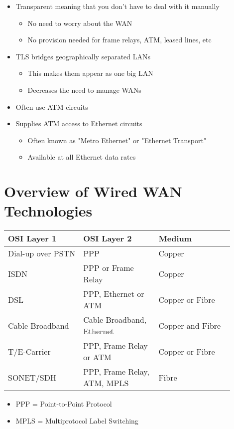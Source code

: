 \begin{itemize}
  \item Transparent meaning that you don't have to deal with it manually
  \begin{itemize}
    \item No need to worry about the WAN
    \item No provision needed for frame relays, ATM, leased lines, etc
  \end{itemize}
  \item TLS bridges geographically separated LANs
  \begin{itemize}
    \item This makes them appear as one big LAN
    \item Decreases the need to manage WANs
  \end{itemize}
  \item Often use ATM circuits
  \item Supplies ATM access to Ethernet circuits
  \begin{itemize}
    \item Often known as "Metro Ethernet" or "Ethernet Transport"
    \item Available at all Ethernet data rates
  \end{itemize}
\end{itemize}

\section*{Overview of Wired WAN Technologies}

\begin{center}
\begin{tabular}{ |p{0.3\linewidth}|p{0.3\linewidth}|p{0.3\linewidth}| }
  \hline
  OSI Layer 1 & OSI Layer 2 & Medium \\
  \hline
  Dial-up over PSTN & PPP & Copper \\
  ISDN & PPP or Frame Relay & Copper \\
  DSL & PPP, Ethernet or ATM & Copper or Fibre \\
  Cable Broadband & Cable Broadband, Ethernet & Copper and Fibre \\
  T/E-Carrier & PPP, Frame Relay or ATM & Copper or Fibre \\
  SONET/SDH & PPP, Frame Relay, ATM, MPLS & Fibre \\
  \hline
\end{tabular}
\end{center}

\begin{itemize}
  \item PPP = Point-to-Point Protocol
  \item MPLS = Multiprotocol Label Switching
\end{itemize}